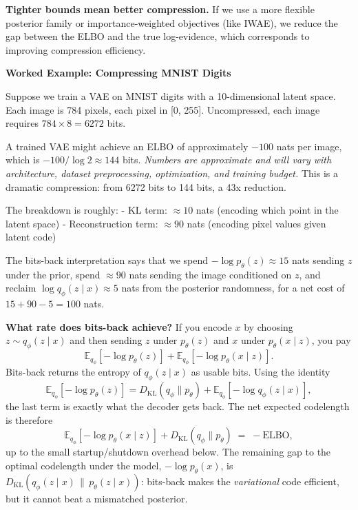 \vspace{0.3cm}

\textbf{Tighter bounds mean better compression.} If we use a more flexible posterior family or importance-weighted objectives (like IWAE), we reduce the gap between the ELBO and the true log-evidence, which corresponds to improving compression efficiency.

\vspace{1.5em}

\begin{examplebox}
\textbf{Worked Example: Compressing MNIST Digits}

Suppose we train a VAE on MNIST digits with a 10-dimensional latent space. Each image is 784 pixels, each pixel in [0, 255]. Uncompressed, each image requires $784 \times 8 = 6272$ bits.

A trained VAE might achieve an ELBO of approximately $-100$ nats per image, which is $-100 / \log 2 \approx 144$ bits. \emph{Numbers are approximate and will vary with architecture, dataset preprocessing, optimization, and training budget.} This is a dramatic compression: from 6272 bits to 144 bits, a 43x reduction.

The breakdown is roughly:
- KL term: $\approx 10$ nats (encoding which point in the latent space)
- Reconstruction term: $\approx 90$ nats (encoding pixel values given latent code)

The bits-back interpretation says that we spend $-\log p_\theta(z) \approx 15$ nats sending $z$ under the prior, spend $\approx 90$ nats sending the image conditioned on $z$, and reclaim $\log q_\phi(z \mid x) \approx 5$ nats from the posterior randomness, for a net cost of $15 + 90 - 5 = 100$ nats.
\end{examplebox}

\vspace{2em}


\vspace{0.3cm}
\begin{keyinsight}
\textbf{What rate does bits-back achieve?} If you encode $x$ by choosing $z\sim q_\phi(z\mid x)$ and then sending $z$ under $p_\theta(z)$ and $x$ under $p_\theta(x\mid z)$, you pay
$$\mathbb{E}_{q_\phi}[{-}\log p_\theta(z)] + \mathbb{E}_{q_\phi}[{-}\log p_\theta(x\mid z)].$$
Bits-back returns the entropy of $q_\phi(z\mid x)$ as usable bits. Using the identity
$$\mathbb{E}_{q_\phi}[{-}\log p_\theta(z)] = D_{\mathrm{KL}}(q_\phi\|p_\theta) + \mathbb{E}_{q_\phi}[{-}\log q_\phi(z\mid x)],$$
the last term is exactly what the decoder gets back. The net expected codelength is therefore
$$\mathbb{E}_{q_\phi}[{-}\log p_\theta(x\mid z)] + D_{\mathrm{KL}}(q_\phi\|p_\theta) \;=\; -\mathrm{ELBO},$$
up to the small startup/shutdown overhead below. The remaining gap to the optimal codelength under the model, $-\log p_\theta(x)$, is $D_{\mathrm{KL}}(q_\phi(z\mid x)\,\|\,p_\theta(z\mid x))$: bits-back makes the \emph{variational} code efficient, but it cannot beat a mismatched posterior.
\end{keyinsight}

